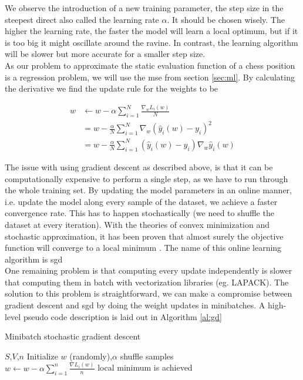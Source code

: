 We observe the introduction of a new training parameter, the step size in the steepest direct also called the learning rate $\alpha$. It should be chosen wisely. The higher the learning rate, the faster the model will learn a local optimum, but if it is too big it might oscillate around the ravine. In contrast, the learning algorithm will be slower but more accurate for a smaller step size. \\
As our problem to approximate the static evaluation function of a chess position is a regression problem, we will use the \gls{mse} from section \ref{sec:ml}. By calculating the derivative we find the update rule for the weights to be

\begin{align}
w&\leftarrow w-\alpha\sum_{i=1}^{N}\frac{\nabla_w L_i(w)}{N} \\
& =w-\frac{\alpha}{N}\sum_{i=1}^{N}\nabla_w\left(\hat{y}_i(w)-y_i\right)^2 \\
& =w-\frac{\alpha}{N}\sum_{i=1}^{N}\left(\hat{y}_i(w)-y_i\right)\nabla_w\hat{y}_i(w)
\end{align}

The issue with using gradient descent as described above, is that it can be computationally expensive to perform a single step, as we have to run through the whole training set. By updating the model parameters in an online manner, i.e. update the model along every sample of the dataset, we achieve a faster convergence rate. This has to happen stochastically (we need to shuffle the dataset at every iteration). With the theories of convex minimization and stochastic approximation, it has been proven that almost surely the objective function will converge to a local minimum \cite{saad98}. The name of this online learning algorithm is \gls{sgd}\\
One remaining problem is that computing every update independently is slower that computing them in batch with vectorization libraries (eg. LAPACK). The solution to this problem is straightforward, we can make a compromise between gradient descent and \gls{sgd} by doing the weight updates in minibatches. A high-level pseudo code description is laid out in Algorithm \ref{al:gd}\\
 
\begin{algorithm}
  \caption{Minibatch stochastic gradient descent}
  \label{al:gd}
  \begin{algorithmic}
  	\REQUIRE $S$,$V$,$n$
	\STATE Initialize $w$ (randomly),$\alpha$
	\REPEAT
		\STATE shuffle samples \\
			\STATE $w \gets w-\alpha\sum_{i=1}^{n}\frac{\nabla L_i(w)}{n}$
		\ENDFOR
	\UNTIL local minimum is achieved
  \end{algorithmic}
\end{algorithm}

